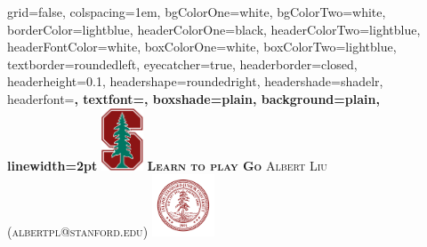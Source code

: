 \documentclass[landscape,a0paper,fontscale=0.285]{baposter}
\begin{document}


\begin{poster}%
  {
  grid=false,
  colspacing=1em,
  bgColorOne=white,
  bgColorTwo=white,
  borderColor=lightblue,
  headerColorOne=black,
  headerColorTwo=lightblue,
  headerFontColor=white,
  boxColorOne=white,
  boxColorTwo=lightblue,
  textborder=roundedleft,
  eyecatcher=true,
  headerborder=closed,
  headerheight=0.1\textheight,
  headershape=roundedright,
  headershade=shadelr,
  headerfont=\Large\bf\textsc, %
  textfont={\setlength{\parindent}{1.5em}},
  boxshade=plain,
  background=plain,
  linewidth=2pt
  }
  {\includegraphics[height=5em]{SU_New_BlockStree_2color}}
  {\bf\textsc{Learn to play Go}\vspace{0.5em}}
  {\textsc{Albert Liu (albertpl@stanford.edu})}
  {%
    \includegraphics[height=5.0em]{SU_Seal_Red}
  }

    \newcommand{\colouredcircle}{%
      \tikz{\useasboundingbox (-0.2em,-0.32em) rectangle(0.2em,0.32em);
            \draw[draw=black,fill=lightblue,line width=0.03em] (0,0) circle(0.18em);
      }
    }



\end{poster}
\end{document}
